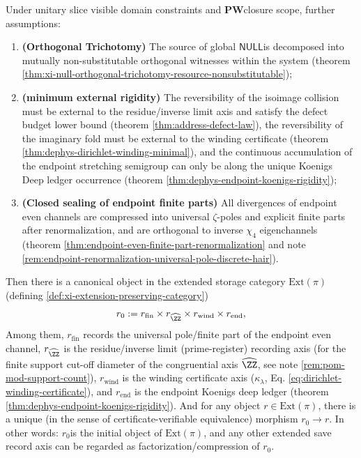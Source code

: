 \begin{theorem}\label{thm:xi-extension-preserving-initial-object}
Under unitary slice visible domain constraints and \(\mathbf{PW}\) ​​closure scope, further assumptions:
\begin{enumerate}
  \item \textbf{(Orthogonal Trichotomy)} The source of global \(\mathsf{NULL}\) ​​is decomposed into mutually non-substitutable orthogonal witnesses within the system (theorem \ref{thm:xi-null-orthogonal-trichotomy-resource-nonsubstitutable});
  \item \textbf{(minimum external rigidity)} The reversibility of the isoimage collision must be external to the residue/inverse limit axis and satisfy the defect budget lower bound (theorem \ref{thm:address-defect-law}), the reversibility of the imaginary fold must be external to the winding certificate (theorem \ref{thm:dephys-dirichlet-winding-minimal}), and the continuous accumulation of the endpoint stretching semigroup can only be along the unique Koenigs Deep ledger occurrence (theorem \ref{thm:dephys-endpoint-koenigs-rigidity});
  \item \textbf{(Closed sealing of endpoint finite parts)} All divergences of endpoint even channels are compressed into universal \(\zeta\)-poles and explicit finite parts after renormalization, and are orthogonal to inverse \(\chi_4\) eigenchannels (theorem \ref{thm:endpoint-even-finite-part-renormalization} and note \ref{rem:endpoint-renormalization-universal-pole-discrete-hair}).
\end{enumerate}
Then there is a canonical object in the extended storage category \(\mathrm{Ext}(\pi)\) ​​(defining \ref{def:xi-extension-preserving-category})
\[
r_0
:=
r_{\mathrm{fin}}\times r_{\widehat{\ZZ}}\times r_{\mathrm{wind}}\times r_{\mathrm{end}},
\]
Among them, \(r_{\mathrm{fin}}\) records the universal pole/finite part of the endpoint even channel, \(r_{\widehat{\ZZ}}\) is the residue/inverse limit (prime-register) recording axis (for the finite support cut-off diameter of the congruential axis \(\widehat{\ZZ}\), see note \ref{rem:pom-mod-support-count}), \(r_{\mathrm{wind}}\) is the winding certificate axis (\(\kappa_\lambda\), Eq. \eqref{eq:dirichlet-winding-certificate}), and \(r_{\mathrm{end}}\) is the endpoint Koenigs deep ledger (theorem \ref{thm:dephys-endpoint-koenigs-rigidity}).
And for any object \(r\in\mathrm{Ext}(\pi)\), there is a unique (in the sense of certificate-verifiable equivalence) morphism \(r_0\to r\).
In other words: \(r_0\) ​​is the initial object of \(\mathrm{Ext}(\pi)\), and any other extended save record axis can be regarded as factorization/compression of \(r_0\).
\end{theorem}

